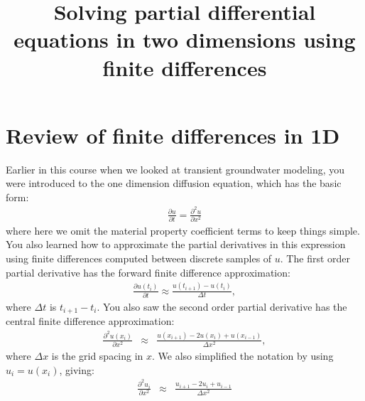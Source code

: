 \documentclass[11pt, oneside]{article}   	%
\date{}							%
\begin{document}
\title{\bf Solving partial differential equations in two dimensions using finite differences }

\maketitle
 

\section*{Review of finite differences in 1D}

Earlier in this course when we looked at transient groundwater modeling, you were introduced to the one dimension diffusion equation, which has the basic form:
\begin{eqnarray}
 	\frac{\partial u}{\partial t} =   \frac{\partial^2 u}{\partial x^2}  
\end{eqnarray} 
where here we omit the material property coefficient terms to keep things simple.  You also learned how to approximate the partial derivatives in this expression using finite differences computed between discrete samples of $u$. The first order partial derivative has the forward finite difference approximation:
\begin{eqnarray}
	\frac{\partial u(t_i)}{\partial t}  \approx \frac{u(t_{i+1}) - u(t_i)}{\Delta t} ,
\label{FOFD}
\end{eqnarray}
where  $\Delta t$ is   $t_{i+1} - t_i$. You also saw the second order partial derivative  has the central finite difference approximation:
\begin{eqnarray}
	\frac{\partial^2 u(x_i)}{\partial x^2}  & \approx& \frac{u(x_{i+1}) - 2 u(x_i) + u(x_{i-1})  }{\Delta x^2} ,
\label{SOFD}
\end{eqnarray}
where  $\Delta x$ is the grid spacing in $x$. We also simplified the notation by using $u_i = u(x_i)$, giving:
\begin{eqnarray}
	\frac{\partial^2 u_i}{\partial x^2}  & \approx& \frac{u_{i+1} - 2 u_i + u_{i-1}  }{\Delta x^2}  
\label{SOFD2}
\end{eqnarray}
 
\end{document}

